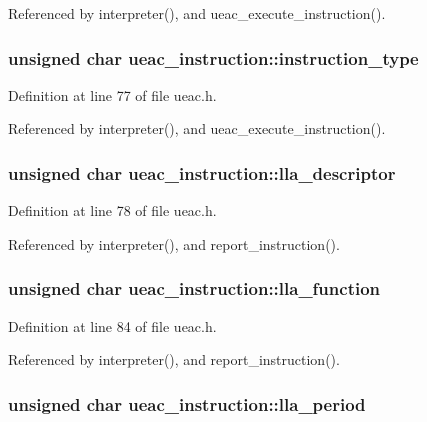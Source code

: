 Referenced by interpreter(), and ueac\_\-execute\_\-instruction().
\subsubsection{\setlength{\rightskip}{0pt plus 5cm}unsigned char {\bf ueac\_\-instruction::instruction\_\-type}}\label{structueac__instruction_o1}




Definition at line 77 of file ueac.h.

Referenced by interpreter(), and ueac\_\-execute\_\-instruction().
\subsubsection{\setlength{\rightskip}{0pt plus 5cm}unsigned char {\bf ueac\_\-instruction::lla\_\-descriptor}}\label{structueac__instruction_o2}




Definition at line 78 of file ueac.h.

Referenced by interpreter(), and report\_\-instruction().
\subsubsection{\setlength{\rightskip}{0pt plus 5cm}unsigned char {\bf ueac\_\-instruction::lla\_\-function}}\label{structueac__instruction_o8}




Definition at line 84 of file ueac.h.

Referenced by interpreter(), and report\_\-instruction().
\subsubsection{\setlength{\rightskip}{0pt plus 5cm}unsigned char {\bf ueac\_\-instruction::lla\_\-period}}\label{structueac__instruction_o9}




